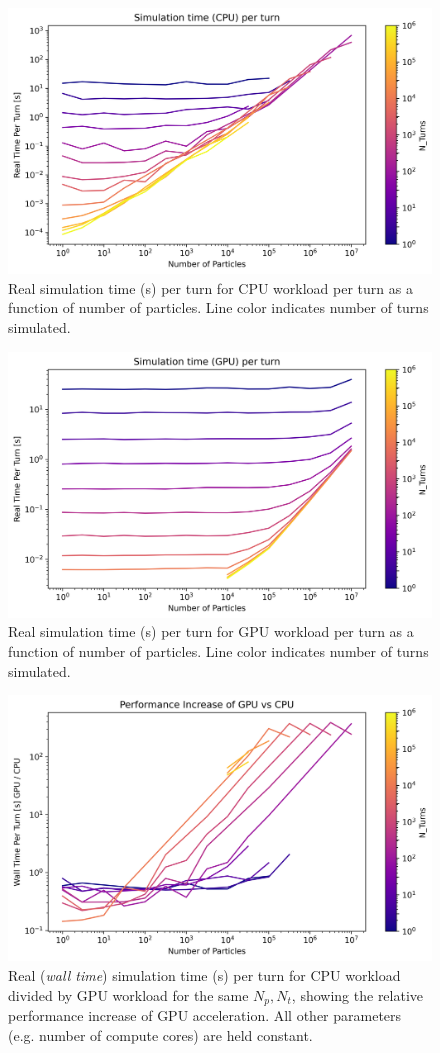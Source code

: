 \documentclass[11pt]{report}
\begin{document}
\begin{figure}
  \centering
  \includegraphics*[width=0.7\linewidth]{CPU_graph_per_turn.png}
  \caption{Real simulation time (s) per turn for CPU workload per turn as a function of number of particles. Line color indicates number of turns simulated.}\label{fig:cpu_graph_per_turn}
\end{figure}

\begin{figure}[h]
  \centering
  \includegraphics*[width=0.7\linewidth]{GPU_graph_per_turn.png}
  \caption{Real simulation time (s) per turn for GPU workload per turn as a function of number of particles. Line color indicates number of turns simulated.}\label{fig:gpu_graph_per_turn}
\end{figure}


\begin{figure}
  \centering
  \includegraphics*[width=0.7\linewidth]{COMPARISON_graph_per_turn.png}
  \cprotect\caption{Real (\textit{wall time}) simulation time (s) per turn for CPU workload divided by GPU workload for the same $N_p, N_t$, showing the relative performance increase of GPU acceleration. All other parameters (e.g. number of compute cores) are held constant.}\label{fig:comparison_graph_per_turn}
\end{figure}
\end{document}
